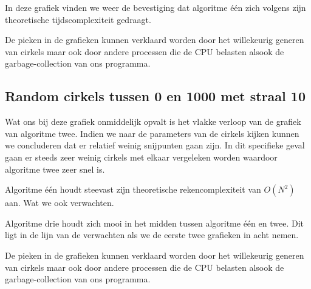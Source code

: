 \documentclass[11pt,a4paper]{article}
\begin{document}
In deze grafiek vinden we weer de bevestiging dat algoritme \'e\'en zich volgens zijn theoretische tijdscomplexiteit gedraagt.

De pieken in de grafieken kunnen verklaard worden door het willekeurig generen van cirkels maar ook door andere processen die de CPU belasten alsook de garbage-collection van ons programma. 

\subsection{Random cirkels tussen 0 en 1000 met straal 10}

Wat ons bij deze grafiek onmiddelijk opvalt is het vlakke verloop van de grafiek van algoritme twee. Indien we naar de parameters van de cirkels kijken kunnen we concluderen dat er relatief weinig snijpunten gaan zijn. In dit specifieke geval gaan er steeds zeer weinig cirkels met elkaar vergeleken worden waardoor algoritme twee zeer snel is.

Algoritme \'e\'en houdt steevast zijn theoretische rekencomplexiteit van $O(N^{2})$ aan. Wat we ook verwachten.

Algoritme drie houdt zich mooi in het midden tussen algoritme \'e\'en en twee. Dit ligt in de lijn van de verwachten als we de eerste twee grafieken in acht nemen.

De pieken in de grafieken kunnen verklaard worden door het willekeurig generen van cirkels maar ook door andere processen die de CPU belasten alsook de garbage-collection van ons programma. 
\end{document}
